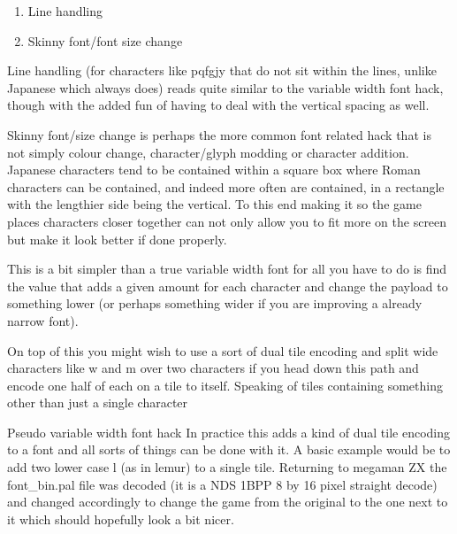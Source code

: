 \documentclass[
]{book}
\providecommand{\tightlist}{%
  \setlength{\itemsep}{0pt}\setlength{\parskip}{0pt}}
\begin{document}
\begin{enumerate}
\def\labelenumi{\arabic{enumi}.}
\tightlist
\item
  Line handling
\item
  Skinny font/font size change
\end{enumerate}

Line handling (for characters like pqfgjy that do not sit within the lines, unlike Japanese which always does) reads quite similar to the variable width font hack, though with the added fun of having to deal with the vertical spacing as well.

Skinny font/size change is perhaps the more common font related hack that is not simply colour change, character/glyph modding or character addition. Japanese characters tend to be contained within a square box where Roman characters can be contained, and indeed more often are contained, in a rectangle with the lengthier side being the vertical. To this end making it so the game places characters closer together can not only allow you to fit more on the screen but make it look better if done properly.

This is a bit simpler than a true variable width font for all you have to do is find the value that adds a given amount for each character and change the payload to something lower (or perhaps something wider if you are improving a already narrow font).

On top of this you might wish to use a sort of dual tile encoding and split wide characters like w and m over two characters if you head down this path and encode one half of each on a tile to itself. Speaking of tiles containing something other than just a single character

Pseudo variable width font hack In practice this adds a kind of dual tile encoding to a font and all sorts of things can be done with it. A basic example would be to add two lower case l (as in lemur) to a single tile. Returning to megaman ZX the font\_bin.pal file was decoded (it is a NDS 1BPP 8 by 16 pixel straight decode) and changed accordingly to change the game from the original to the one next to it which should hopefully look a bit nicer.
\end{document}
